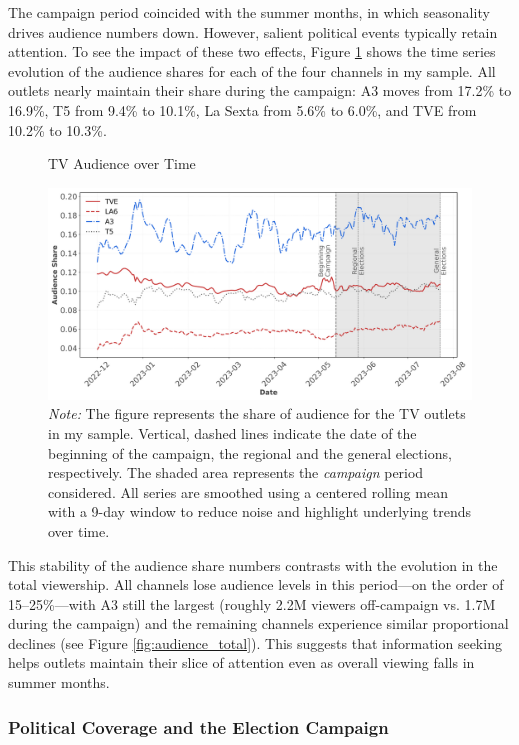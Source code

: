 \documentclass[12pt]{article}
\begin{document}
	
The campaign period coincided with the summer months, in which seasonality drives audience numbers down. However, salient political events typically retain attention. To see the impact of these two effects, 	Figure \ref{fig:audience_share} shows the time series evolution of the audience shares for each of the four channels in my sample. All outlets nearly maintain their share during the campaign: A3 moves from 17.2\% to 16.9\%, T5 from 9.4\% to 10.1\%, La Sexta from 5.6\% to 6.0\%, and TVE from 10.2\% to 10.3\%. 
	
	
		\begin{figure}[!htbp]
		\caption{TV Audience over Time}
		\centering
		\includegraphics[width=150mm]{figures/tv_audience_sharev2}
		\caption*{\small \textit{Note:} The figure represents the share of audience for the TV outlets in my sample.  Vertical, dashed lines indicate the date of the beginning of the campaign, the regional and the general elections, respectively. The shaded area represents the \textit{campaign} period considered.  All series are smoothed using a centered rolling mean with a 9-day window to reduce noise and highlight underlying trends over time.}
		\label{fig:audience_share}
	\end{figure}
	
	

This stability of the audience share numbers contrasts with the evolution in the total viewership. All channels lose audience levels in this period—on the order of 15–25\%—with A3 still the largest (roughly 2.2M viewers off-campaign vs. 1.7M during the campaign) and the remaining channels experience similar proportional declines (see Figure  \ref{fig:audience_total}). This  suggests that information seeking  helps outlets maintain their slice of attention even as overall viewing falls in summer months. 


	
		\subsubsection*{Political Coverage and the Election Campaign}
		
\end{document}
